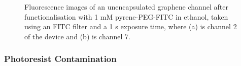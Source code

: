\documentclass[
  a4paper,
]{scrbook}
\begin{document}
\begin{figure}
\begin{minipage}[t]{0.47\linewidth}
{{}

}

\subcaption{\label{fig-FITC-EtOH-ch7}}
\end{minipage}%

\caption{\label{fig-FITC-EtOH}Fluorescence images of an unencapsulated
graphene channel after functionalisation with 1 mM pyrene-PEG-FITC in
ethanol, taken using an FITC filter and a 1 s exposure time, where (a)
is channel 2 of the device and (b) is channel 7.}

\end{figure}

\hypertarget{photoresist-contamination}{%
\subsubsection*{Photoresist
Contamination}\label{photoresist-contamination}}
\end{document}
